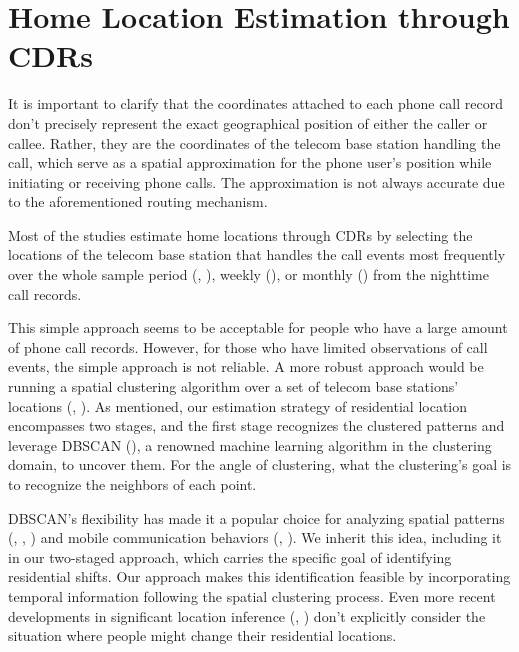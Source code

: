 \section{Home Location Estimation through CDRs}\label{sec:2_home_location_estimation_through_cdrs}
It is important to clarify that the coordinates attached to each phone call record don't precisely represent the exact geographical position of either the caller or callee.
Rather, they are the coordinates of the telecom base station handling the call, which serve as a spatial approximation for the phone user's position while initiating or receiving phone calls.
The approximation is not always accurate due to the aforementioned routing mechanism.

Most of the studies estimate home locations through CDRs by selecting the locations of the telecom base station that handles the call events most frequently over the whole sample period (\cite{cho2011friendship}, \cite{phithakkitnukoon2012socio}), weekly (\cite{referral_effect_2023aer}), or monthly (\cite{phithakkitnukoon2022inferring}) from the nighttime call records.


This simple approach seems to be acceptable for people who have a large amount of phone call records. However, for those who have limited observations of call events, the simple approach is not reliable. A more robust approach would be running a spatial clustering algorithm over a set of telecom base stations' locations (\cite{isaacman2011identifying}, \cite{yang2014identifying}). As mentioned, our estimation strategy of residential location encompasses two stages, and the first stage recognizes the clustered patterns and leverage DBSCAN (\cite{ester1996density}), a renowned machine learning algorithm in the clustering domain, to uncover them. For the angle of clustering, what the clustering's goal is to recognize the neighbors of each point.


DBSCAN's flexibility has made it a popular choice for analyzing spatial patterns (\cite{yang2014identifying}, \cite{shi2014density}, \cite{dominguez2017sensing}) and mobile communication behaviors (\cite{karahoca2006comparing}, \cite{jabbar2020fraud}).
We inherit this idea, including it in our two-staged approach, which carries the specific goal of identifying residential shifts.
Our approach makes this identification feasible by incorporating temporal information following the spatial clustering process.
Even more recent developments in significant location inference (\cite{tongsinoot2017exploring}, \cite{luo2020research}) don't explicitly consider the situation where people might change their residential locations.


